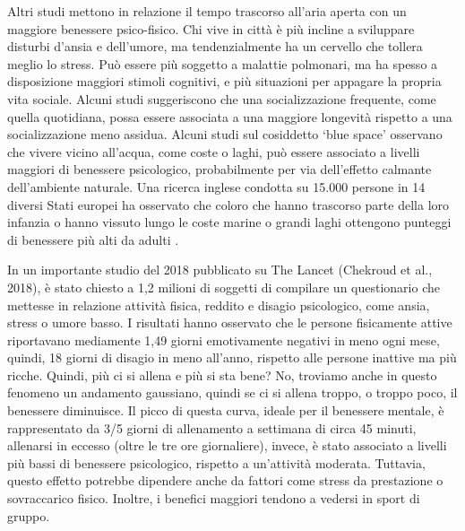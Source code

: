 \documentclass[12pt]{book} %
\begin{document}
\begin{mdframed}[linewidth=1pt]
Altri studi mettono in relazione il tempo trascorso all'aria aperta con un maggiore benessere psico-fisico. Chi vive in
città è più incline a sviluppare disturbi d'ansia e dell'umore, ma tendenzialmente ha un cervello che tollera meglio lo stress. Può
essere più soggetto a malattie polmonari, ma ha spesso a disposizione maggiori stimoli cognitivi, e più situazioni per
appagare la propria vita sociale. Alcuni studi suggeriscono che una socializzazione frequente, come quella quotidiana, possa essere associata a una maggiore longevità rispetto a una socializzazione meno assidua.
Alcuni studi sul cosiddetto ‘blue space’ osservano che vivere vicino all’acqua, come coste o laghi, può essere associato a livelli maggiori di benessere psicologico, probabilmente per via dell’effetto calmante dell’ambiente naturale. Una ricerca inglese condotta su 15.000 persone in 14 diversi Stati europei ha osservato che coloro che hanno trascorso parte della loro infanzia o hanno vissuto lungo le coste marine o grandi laghi ottengono punteggi di benessere più alti da adulti .

In un importante studio del 2018 pubblicato su The Lancet (Chekroud et al.,
2018), è stato chiesto a 1,2 milioni
di soggetti di compilare un questionario che mettesse in relazione attività fisica, reddito e disagio psicologico, come
ansia, stress o umore basso. I risultati hanno osservato che le persone fisicamente attive riportavano mediamente 1,49
giorni emotivamente negativi in meno ogni mese, quindi, 18 giorni di disagio in meno all'anno,
rispetto alle persone inattive ma più ricche. Quindi, più ci si allena e più si sta bene? No, troviamo anche in questo
fenomeno un andamento gaussiano, quindi se ci si allena troppo, o troppo poco, il benessere diminuisce. Il picco di
questa curva, ideale per il benessere mentale, è rappresentato da 3/5 giorni di allenamento a settimana di circa 45
minuti, allenarsi in eccesso (oltre le tre ore giornaliere), invece, è stato associato a livelli più bassi di benessere psicologico, rispetto a un’attività moderata. Tuttavia, questo effetto potrebbe dipendere anche da fattori come stress da prestazione o sovraccarico fisico. 
Inoltre, i benefici maggiori tendono a vedersi in sport di gruppo.


\end{mdframed}
\end{document}

